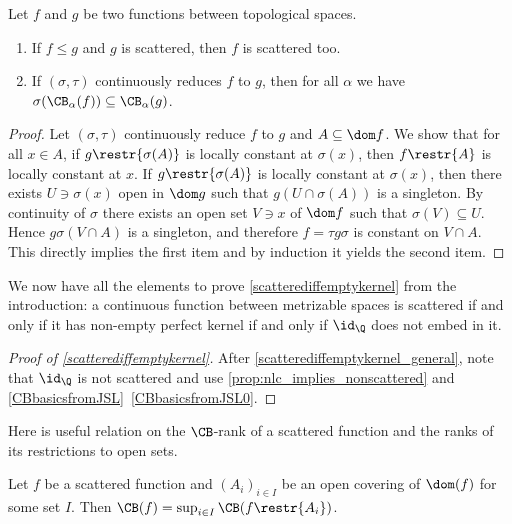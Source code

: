 \begin{proposition}\label{CBbasicsfromJSL}
Let $f$ and $g$ be two functions between topological spaces. %
\begin{enumerate}
\item If $f\leq g$ and $g$ is scattered, then $f$ is scattered too. \label{CBbasicsfromJSL0}
\item If $(\sigma,\tau)$ continuously reduces $f$ to $g$, then for all $\alpha$ we have $\sigma(\CB_\alpha(f))\subseteq\CB_\alpha(g)$. \label{CBbasicsfromJSL1}
\end{enumerate}
\end{proposition}
\begin{proof}
Let $(\sigma,\tau)$ continuously reduce $f$ to $g$ and $A\subseteq \dom f$. We show that for all $x\in A$, if $g\restr{\sigma(A)}$ is locally constant at $\sigma(x)$, then $f\restr{A}$ is locally constant at $x$. If $g\restr{\sigma(A)}$ is locally constant at $\sigma(x)$, then there exists $U\ni \sigma(x)$ open in $\dom g$ such that $g(U\cap \sigma(A))$ is a singleton. By continuity of $\sigma$ there exists an open set $V\ni x$ of $\dom f$ such that $\sigma(V)\subseteq U$.
Hence $g\sigma(V\cap A)$ is a singleton, and therefore $f=\tau g \sigma$ is constant on $V\cap A$. This directly implies the first item and by induction it yields the second item.
\end{proof}

We now have all the elements to prove \cref{scatterediffemptykernel} from the introduction:
a continuous function between metrizable spaces is scattered if and only if it has non-empty perfect kernel if and only if $\id_\Q$ does not embed in it.

\begin{proof}[Proof of \cref{scatterediffemptykernel}]
After \cref{scatterediffemptykernel_general}, note that $\id_\Q$ is not scattered and use \cref{prop:nlc_implies_nonscattered} and \cref{CBbasicsfromJSL}~\cref{CBbasicsfromJSL0}.
\end{proof}

Here is useful relation on the $\CB$-rank of a scattered function and the ranks of its restrictions to open sets. %

\begin{corollary}\label{CBrankofclopenunion}
Let $f$ be a scattered function and $(A_i)_{i\in I}$ be an open covering of $\dom(f)$ for some set $I$.
Then $\CB(f)=\sup_{i\in I}\CB(f\restr{A_i})$.
\end{corollary}

